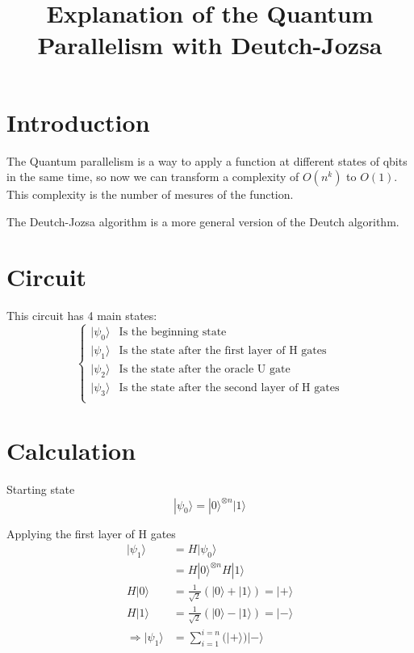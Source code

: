 \documentclass{article}
\begin{document}
\title{Explanation of the Quantum Parallelism with Deutch-Jozsa}
\section{Introduction}
The Quantum parallelism is a way to apply a function at different states of qbits
in the same time, so now we can transform a complexity of $O(n^k)$ to $O(1)$.
This complexity is the number of mesures of the function.

The Deutch-Jozsa algorithm is a more general version of the Deutch algorithm.

\section{Circuit}

This circuit has 4 main states:
\begin{equation}
    \begin{cases}
        |\psi_0\rangle & \text{Is the beginning state} \\
        |\psi_1\rangle & \text{Is the state after the first layer of H gates} \\
        |\psi_2\rangle & \text{Is the state after the oracle U gate} \\
        |\psi_3\rangle & \text{Is the state after the second layer of H gates} \\
    \end{cases}
\end{equation}

\section{Calculation}

Starting state
\begin{equation}
    |\psi_0\rangle = |0\rangle^{\otimes n}|1\rangle
\end{equation}

Applying the first layer of H gates
\begin{equation}
    \begin{split}
        |\psi_1\rangle & = H|\psi_0\rangle \\
        & = H|0\rangle^{\otimes n}H|1\rangle \\
        H|0\rangle & = \frac{1}{\sqrt{2}}(|0\rangle + |1\rangle) = |+\rangle \\
        H|1\rangle & = \frac{1}{\sqrt{2}}(|0\rangle - |1\rangle) = |-\rangle \\
        \Longrightarrow |\psi_1\rangle & = \sum_{i=1}^{i=n}(|+\rangle)|-\rangle \\
    \end{split}
\end{equation}
\end{document}
